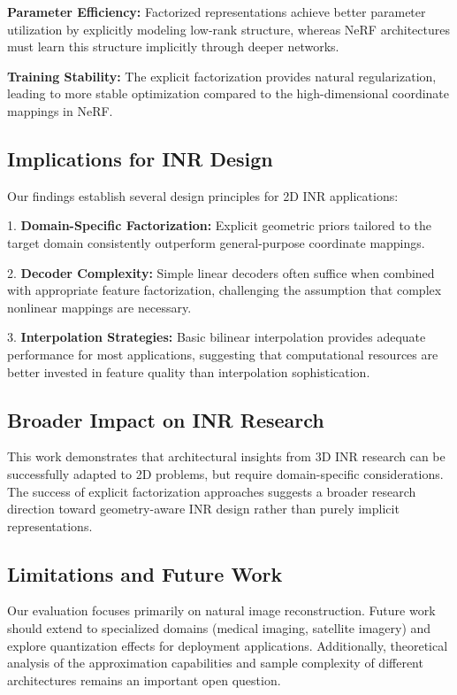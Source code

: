 \documentclass{article}
\begin{document}
\textbf{Parameter Efficiency:} Factorized representations achieve better parameter utilization by explicitly modeling low-rank structure, whereas NeRF architectures must learn this structure implicitly through deeper networks.

\textbf{Training Stability:} The explicit factorization provides natural regularization, leading to more stable optimization compared to the high-dimensional coordinate mappings in NeRF.

\subsection{Implications for INR Design}

Our findings establish several design principles for 2D INR applications:

1. \textbf{Domain-Specific Factorization:} Explicit geometric priors tailored to the target domain consistently outperform general-purpose coordinate mappings.

2. \textbf{Decoder Complexity:} Simple linear decoders often suffice when combined with appropriate feature factorization, challenging the assumption that complex nonlinear mappings are necessary.

3. \textbf{Interpolation Strategies:} Basic bilinear interpolation provides adequate performance for most applications, suggesting that computational resources are better invested in feature quality than interpolation sophistication.

\subsection{Broader Impact on INR Research}

This work demonstrates that architectural insights from 3D INR research can be successfully adapted to 2D problems, but require domain-specific considerations. The success of explicit factorization approaches suggests a broader research direction toward geometry-aware INR design rather than purely implicit representations.

\subsection{Limitations and Future Work}

Our evaluation focuses primarily on natural image reconstruction. Future work should extend to specialized domains (medical imaging, satellite imagery) and explore quantization effects for deployment applications. Additionally, theoretical analysis of the approximation capabilities and sample complexity of different architectures remains an important open question.
\end{document}
